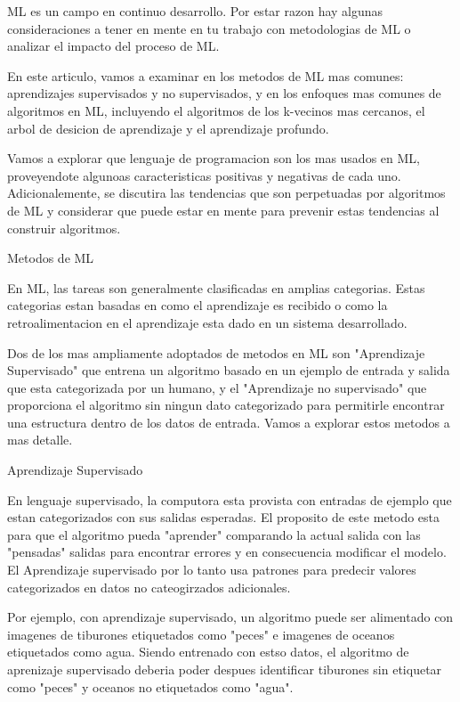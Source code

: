 ML es un campo en continuo desarrollo. Por estar razon hay algunas consideraciones a tener en mente en tu trabajo con metodologias de ML o analizar el impacto del proceso de ML.

En este articulo, vamos a examinar en los metodos de ML mas comunes: aprendizajes supervisados y no supervisados, y en los enfoques mas comunes de algoritmos en ML, incluyendo el algoritmos de los k-vecinos mas cercanos, el arbol de desicion de aprendizaje y el aprendizaje profundo.

Vamos a explorar que lenguaje de programacion son los mas usados en ML, proveyendote algunoas caracteristicas positivas y negativas de cada uno. Adicionalemente, se discutira las tendencias que son perpetuadas por algoritmos de ML y considerar que puede estar en mente para prevenir estas tendencias al construir algoritmos.

Metodos de ML

En ML, las tareas son generalmente clasificadas en amplias categorias. Estas categorias estan basadas en como el aprendizaje es recibido o como la retroalimentacion en el aprendizaje esta dado en un sistema desarrollado.

Dos de los mas ampliamente adoptados de metodos en ML son "Aprendizaje Supervisado" que entrena un algoritmo basado en un ejemplo de entrada y salida que esta categorizada por un humano, y el "Aprendizaje no supervisado" que proporciona el algoritmo sin ningun dato categorizado para permitirle encontrar una estructura dentro de los datos de entrada. Vamos a explorar estos metodos a mas detalle.

Aprendizaje Supervisado

En lenguaje supervisado, la computora esta provista con entradas de ejemplo que estan categorizados con sus salidas esperadas. El proposito de este metodo esta para que el algoritmo pueda "aprender" comparando la actual salida con las "pensadas" salidas para encontrar errores y en consecuencia modificar el modelo. El Aprendizaje supervisado por lo tanto usa patrones para predecir valores categorizados en datos no cateogirzados adicionales.

Por ejemplo, con aprendizaje supervisado, un algoritmo puede ser alimentado con imagenes de tiburones etiquetados como "peces" e imagenes de oceanos etiquetados como agua. Siendo entrenado con estso datos, el algoritmo de aprenizaje supervisado deberia poder despues identificar tiburones sin etiquetar como "peces" y oceanos no etiquetados como "agua".

